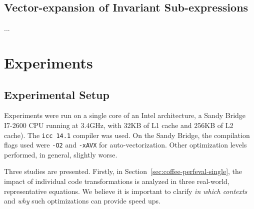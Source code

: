 \subsection{Vector-expansion of Invariant Sub-expressions}
\label{sec:coffee-precompute}
...
%
%




\section{Experiments}
\label{sec:coffee-perfeval}

\subsection{Experimental Setup}
\label{sec:coffee-perfeval-setup}
Experiments were run on a single core of an Intel architecture, a Sandy Bridge I7-2600 CPU running at 3.4GHz, with 32KB of L1 cache and 256KB of L2 cache). The \texttt{icc 14.1}  compiler was used. On the Sandy Bridge, the compilation flags used were \texttt{-O2} and \texttt{-xAVX} for auto-vectorization. Other optimization levels performed, in general, slightly worse.

Three studies are presented. Firstly, in Section~\ref{sec:coffee-perfeval-single}, the impact of individual code transformations is analyzed in three real-world, representative equations. We believe it is important to clarify \textit{in which contexts} and \textit{why} such optimizations can provide speed ups. 

